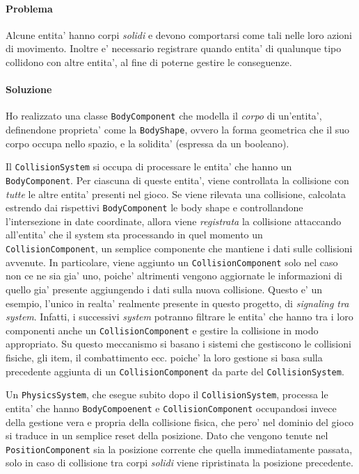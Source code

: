 \documentclass[a4paper,12pt]{report}
\begin{document}
\paragraph{Problema}
Alcune entita' hanno corpi \textit{solidi} e devono comportarsi come tali nelle loro azioni di movimento. Inoltre e' necessario registrare quando entita' di qualunque tipo collidono con altre entita', al fine di poterne gestire le conseguenze.

\paragraph{Soluzione}
Ho realizzato una classe \texttt{BodyComponent} che modella il \textit{corpo} di un'entita', definendone proprieta' come la \texttt{BodyShape}, ovvero la forma geometrica che il suo corpo occupa nello spazio, e la solidita'
(espressa da un booleano). 

Il \texttt{CollisionSystem} si occupa di processare le entita' che hanno un \texttt{BodyComponent}. Per ciascuna di queste entita', viene controllata la collisione con \textit{tutte} le altre entita' presenti nel gioco. Se viene rilevata una collisione, calcolata estrendo dai rispettivi \texttt{BodyComponent} le body shape e controllandone l'intersezione in date coordinate, allora viene \textit{registrata} la collisione attaccando all'entita' che il system sta processando in quel momento un \texttt{CollisionComponent}, un semplice componente che mantiene i dati sulle collisioni avvenute. In particolare, viene aggiunto un \texttt{CollisionComponent} solo nel caso non ce ne sia gia' uno, poiche' altrimenti vengono aggiornate le informazioni di quello gia' presente aggiungendo i dati sulla nuova collisione. Questo e' un esempio, l'unico in realta' realmente presente in questo progetto, di \textit{signaling tra system}. Infatti, i successivi \textit{system} potranno filtrare le entita' che hanno tra i loro componenti anche un \texttt{CollisionComponent} e gestire la collisione in modo appropriato. Su questo meccanismo si basano i sistemi che gestiscono le collisioni fisiche, gli item, il combattimento ecc. poiche' la loro gestione si basa sulla precedente aggiunta di un \texttt{CollisionComponent} da parte del \texttt{CollisionSystem}.

Un \texttt{PhysicsSystem}, che esegue subito dopo il \texttt{CollisionSystem}, processa le entita' che hanno \texttt{BodyCompoenent} e \texttt{CollisionComponent} occupandosi invece della gestione vera e propria della collisione fisica, che pero' nel dominio del gioco si traduce in un semplice reset della posizione. Dato che vengono tenute nel \texttt{PositionComponent} sia la posizione corrente che quella immediatamente passata, solo in caso di collisione tra corpi \textit{solidi} viene ripristinata la posizione precedente.
\end{document}
